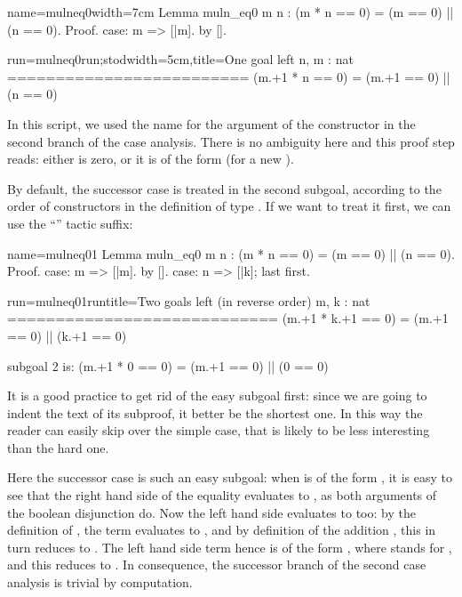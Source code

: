 \begin{coq-left}{name=mulneq0}{width=7cm}
Lemma muln_eq0 m n :
  (m * n == 0) = (m == 0) || (n == 0).
Proof.
case: m => [|m].
  by [].
\end{coq-left}
\begin{coqout-right}{run=mulneq0run;stod}{width=5cm,title=One goal left}
n, m : nat
=========================
(m.+1 * n == 0) =
  (m.+1 == 0) || (n == 0)
\end{coqout-right}

In this script, we used the name  for the argument of the
constructor in the second branch of the case analysis. There is no
ambiguity here and this proof step reads: either  is zero, or it
is of the form  (for a new ).

By default, the successor case is treated in the second subgoal,
according to the order of constructors in the definition of type
. If we want to treat it first, we can use the ``'' tactic suffix:

\begin{coq-left}{name=mulneq01}{}
Lemma muln_eq0 m n :
  (m * n == 0) = (m == 0) || (n == 0).
Proof.
case: m => [|m].
  by [].
case: n => [|k]; last first.
$~$
$~$
\end{coq-left}
\begin{coqout-right}{run=mulneq01run}{title=Two goals left (in reverse order)}
m, k : nat
============================
(m.+1 * k.+1 == 0) =
  (m.+1 == 0) || (k.+1 == 0)

subgoal 2 is:
 (m.+1 * 0 == 0) =
   (m.+1 == 0) || (0 == 0)
\end{coqout-right}

It is a good practice to get rid of the easy subgoal first:
since we are going to indent the text of its subproof, it better be the
shortest one.  In this way the reader can easily skip over the simple
case, that is likely to be less interesting than the hard one.

Here the successor case is such an easy
subgoal: when  is of the form , it is easy to see that the
right hand side of the equality evaluates to , as both
arguments of the boolean disjunction do. Now the left hand side
evaluates to  too: by the definition of , the term
 evaluates to , and by
definition of the addition , this in turn reduces to
. The left hand side term hence is of the form
, where  stands for , and this
reduces to .\label{proof:mulneq0}
In consequence, the successor branch of the second case analysis is trivial
by computation.


